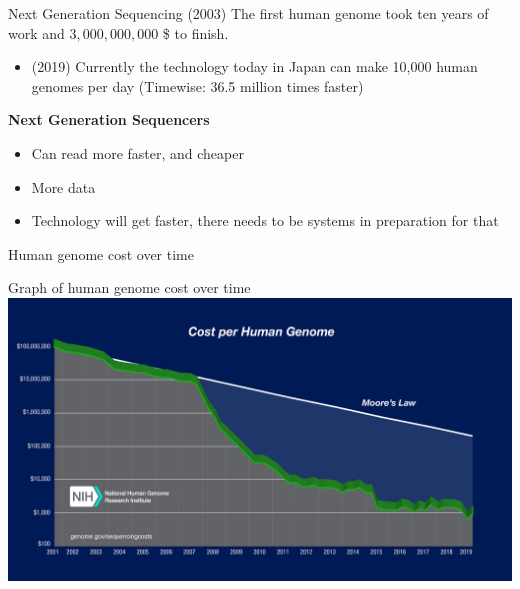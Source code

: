 \documentclass{beamer}
\begin{document}
    \begin{frame}{Next Generation Sequencing}
    (2003) The first human genome took ten years of work and $3,000,000,000$ \$ to finish.
    \begin{itemize}
        \item (2019) Currently the technology today in Japan can make 10,000 human genomes per day (Timewise: 36.5 million times faster) \cite[p.~19]{introgenomics}
    \end{itemize}
    \textbf{Next Generation Sequencers}
        \begin{itemize}
        \item Can read more faster, and cheaper
        \item More data
        \item Technology will get faster, there needs to be systems in preparation for that
    \end{itemize}
    \end{frame}
    
   \begin{frame}{Human genome cost over time}
    
    Graph of human genome cost over time \cite{genomics-cost} \\
    \centering
    \includegraphics[scale=0.3]{human-gen-cost.jpg}
        
    \end{frame}
    
\end{document}
